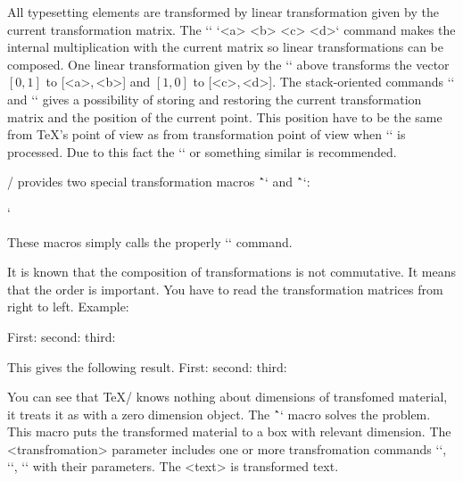 {All typesetting elements are transformed by linear
transformation given by the current transformation matrix. The
`\pdfsetmatrix` `{<a> <b> <c> <d>}` command makes the internal multiplication
with the current matrix so linear transformations can be composed. 
One linear transformation given by the `\pdfsetmatrix` above transforms
the vector $[0,1]$ to [<a>,\,<b>] and $[1,0]$ to [<c>,\,<d>].
The stack-oriented commands `\pdfsave` and `\pdfrestore` gives a possibility of
storing and restoring the current transformation matrix and the position of the current point.
This position have to be the same from \TeX{}'s point of
view as from transformation point of view when `\pdfrestore` is processed.
Due to this fact the `\pdfsave{}\pdfrestore` 
or something similar is recommended.

\OpTeX/ provides two special transformation macros
\^`\pdfscale` and \^`\pdfrotate`:

\begtt \catcode`
\endtt 

These macros simply calls the properly `\pdfsetmatrix` command.

It is known that the composition of transformations is not commutative. It
means that the order is important. You have to read the transformation
matrices from right to left. Example:

\begtt
First: \pdfsave {}\pdfrestore
second: \pdfsave {}\pdfrestore
third: \pdfsave {}%
       \pdfrestore %
\endtt
%
\par\nobreak\bigskip\smallskip
This gives the following result. 
First: \pdfsave {}\pdfrestore
second: \pdfsave {}\pdfrestore
third: \pdfsave {}\pdfrestore
\par\nobreak\bigskip{}%

You can see that \TeX/ knows nothing about dimensions of transfomed material,
it treats it as with a zero dimension object. 
\new
The \^``
macro solves the problem. This macro puts the transformed
material to a box with relevant dimension. The <transfromation> parameter
includes one or more transfromation commands `\pdfsetmatrix`, `\pdfscale`,
`\pdfrotate` with their parameters. The <text> is transformed text.

}
